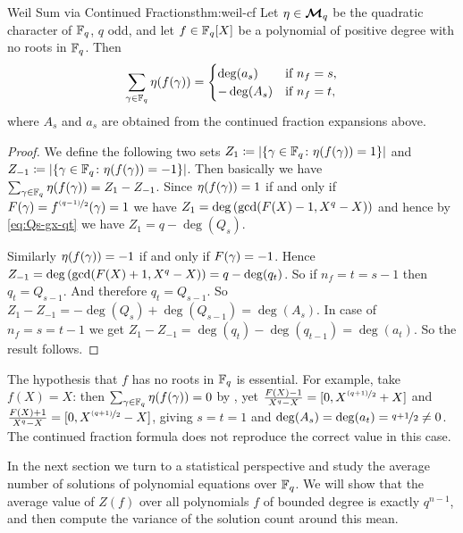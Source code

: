 \begin{Theorem}{Weil Sum via Continued Fractions}{thm:weil-cf}
  Let $\eta\in\boldsymbol{\mathcal{M}}_q$ be the quadratic character of $\mathbb{F}_q$, $q$ odd, and let $f\in\mathbb{F}_q[X]$ be a polynomial of positive degree with no roots in $\mathbb{F}_q$. Then
  $$\sum_{\gamma\in\mathbb{F}_q}\eta(f(\gamma))=\begin{cases}
    \deg(a_s) & \text{if }n_f=s,\\
    -\deg(A_s) & \text{if }n_f=t,
  \end{cases}$$
  where $A_s$ and $a_s$ are obtained from the continued fraction expansions above. 
\end{Theorem}

\begin{proof}
  We define the following two sets $Z_1\coloneqq|\{\gamma\in\mathbb{F}_q\colon \eta(f(\gamma))=1\}|$ and $Z_{-1}\coloneqq |\{\gamma\in\mathbb{F}_q\colon \eta(f(\gamma))=-1\}|$. Then basically we have $\sum_{\gamma\in\mathbb{F}_q}\eta(f(\gamma))=Z_1-Z_{-1}$.  Since $\eta(f(\gamma))=1$ if and only if $F(\gamma)=f^{\nicefrac{(q-1)}{2}}(\gamma)=1$ we have $Z_1=\deg\left(\gcd(F(X)-1,X^q-X)\right)$ and hence by \eqref{eq:Qs-gx-qt} we have  $Z_1=q-\deg(Q_s)$. 
  
  Similarly $\eta(f(\gamma))=-1$ if and only if $F(\gamma)=-1$. Hence $Z_{-1}=\deg\left(\gcd(F(X)+1,X^q-X)\right)=q-\deg(q_t)$. So if $n_f=t=s-1$ then $q_t=Q_{s-1}$. And therefore $q_t=Q_{s-1}$. So $Z_1-Z_{-1}=-\deg(Q_s)+\deg(Q_{s-1})=\deg(A_s)$. In case of $n_f=s=t-1$ we get $Z_1-Z_{-1}=\deg(q_t)-\deg(q_{t-1})=\deg(a_t)$. So the result follows.  
\end{proof}
\begin{note}
  The hypothesis that $f$ has no roots in $\mathbb{F}_q$ is essential. For example, take $f(X)=X$: then $\sum_{\gamma\in\mathbb{F}_q}\eta(f(\gamma))=0$ by \MultCharPropsthm[(i)], yet $\frac{F(X)-1}{X^q-X}=[0,X^{\nicefrac{(q+1)}{2}}+X]$ and $\frac{F(X)+1}{X^q-X}=[0,X^{\nicefrac{(q+1)}{2}}-X]$, giving $s=t=1$ and $\deg(A_s)=\deg(a_t)=\nicefrac{q+1}{2}\neq 0$. The continued fraction formula does not reproduce the correct value in this case.
\end{note} 

In the next section we turn to a statistical perspective and study the average number of solutions of polynomial equations over $\mathbb{F}_q$. We will show that the average value of $Z(f)$ over all polynomials $f$ of bounded degree is exactly $q^{n-1}$, and then compute the variance of the solution count around this mean. 